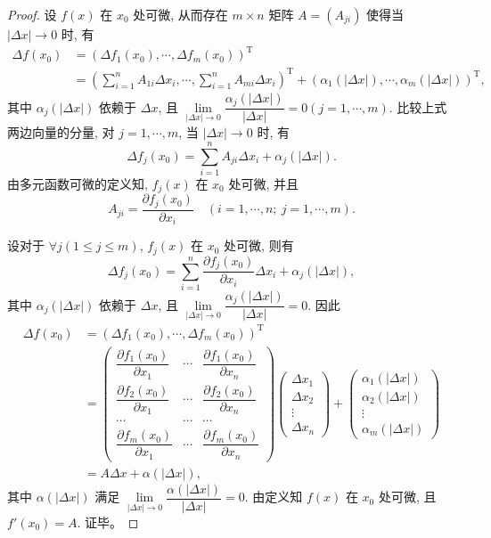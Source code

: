 \documentclass[12pt,fontset=fandol]{ctexart}
\begin{document}
\begin{proof}\quad {}\quad 设 $f(x)$ 在 $x_0$ 处可微, 从而存在 $m\times n$ 矩阵 $A=(A_{ji})$ 使得当 $|\Delta x|\to0$ 时, 有
\[
\begin{aligned}
  \Delta f(x_0)
  &=(\Delta f_1(x_0),\cdots,\Delta f_m(x_0))^\mathrm T\\
  &=\left(\sum_{i=1}^n A_{1i}\Delta x_i,\cdots,\sum_{i=1}^n A_{mi}\Delta x_i\right)^\mathrm T
  +(\alpha_1(|\Delta x|),\cdots,\alpha_m(|\Delta x|))^\mathrm T,
\end{aligned}
\]
其中 $\alpha_j(|\Delta x|)$ 依赖于 $\Delta x$, 且 $\lim\limits_{|\Delta x|\to0}\dfrac{\alpha_j(|\Delta x|)}{|\Delta x|}=0(j=1,\cdots,m)$. 比较上式两边向量的分量, 对 $j=1,\cdots,m$, 当 $|\Delta x|\to0$ 时, 有
\[
  \Delta f_j(x_0)=\sum_{i=1}^n A_{ji}\Delta x_i+\alpha_j(|\Delta x|).
\]
由多元函数可微的定义知, $f_j(x)$ 在 $x_0$ 处可微, 并且
\[
  A_{ji}=\frac{\partial f_j(x_0)}{\partial x_i}
  \quad (i=1,\cdots,n;\ j=1,\cdots,m).
\]

\quad 设对于 $\forall j(1\leqslant j\leqslant m)$, $f_j(x)$ 在 $x_0$ 处可微, 则有
\[
  \Delta f_j(x_0)=\sum_{i=1}^n\frac{\partial f_j(x_0)}{\partial x_i}\Delta x_i+\alpha_j(|\Delta x|),
\]
其中 $\alpha_j(|\Delta x|)$ 依赖于 $\Delta x$, 且 $\lim\limits_{|\Delta x|\to0}\dfrac{\alpha_j(|\Delta x|)}{|\Delta x|}=0$. 因此
\[
\begin{aligned}
  \Delta f(x_0)
  &=(\Delta f_1(x_0),\cdots,\Delta f_m(x_0))^\mathrm T\\
  &=
  \begin{pmatrix}
    \dfrac{\partial f_1(x_0)}{\partial x_1}&\cdots&\dfrac{\partial f_1(x_0)}{\partial x_n}\\
    \dfrac{\partial f_2(x_0)}{\partial x_1}&\cdots&\dfrac{\partial f_2(x_0)}{\partial x_n}\\
    \cdots&\cdots&\cdots\\
    \dfrac{\partial f_m(x_0)}{\partial x_1}&\cdots&\dfrac{\partial f_m(x_0)}{\partial x_n}
  \end{pmatrix}
  \begin{pmatrix}
    \Delta x_1\\
    \Delta x_2\\
    \vdots\\
    \Delta x_n
  \end{pmatrix}
  +
  \begin{pmatrix}
    \alpha_1(|\Delta x|)\\
    \alpha_2(|\Delta x|)\\
    \vdots\\
    \alpha_m(|\Delta x|)
  \end{pmatrix}\\
  &=A\Delta x+\alpha(|\Delta x|),
\end{aligned}
\]
其中 $\alpha(|\Delta x|)$ 满足 $\lim\limits_{|\Delta x|\to0}\dfrac{\alpha(|\Delta x|)}{|\Delta x|}=0$. 由定义知 $f(x)$ 在 $x_0$ 处可微, 且 $f'(x_0)=A$. 证毕。


\end{proof}
\end{document}
